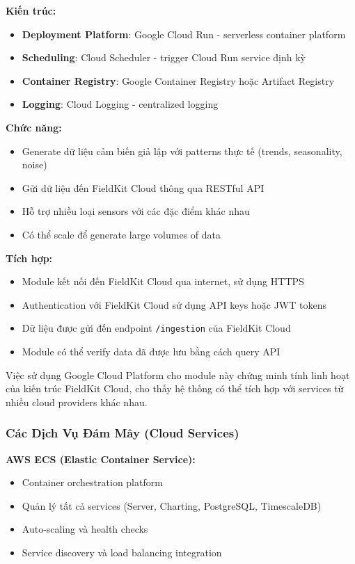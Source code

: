 \textbf{Kiến trúc:}
\begin{itemize}
    \item \textbf{Deployment Platform}: Google Cloud Run - serverless container platform
    \item \textbf{Scheduling}: Cloud Scheduler - trigger Cloud Run service định kỳ
    \item \textbf{Container Registry}: Google Container Registry hoặc Artifact Registry
    \item \textbf{Logging}: Cloud Logging - centralized logging
\end{itemize}

\textbf{Chức năng:}
\begin{itemize}
    \item Generate dữ liệu cảm biến giả lập với patterns thực tế (trends, seasonality, noise)
    \item Gửi dữ liệu đến FieldKit Cloud thông qua RESTful API
    \item Hỗ trợ nhiều loại sensors với các đặc điểm khác nhau
    \item Có thể scale để generate large volumes of data
\end{itemize}

\textbf{Tích hợp:}
\begin{itemize}
    \item Module kết nối đến FieldKit Cloud qua internet, sử dụng HTTPS
    \item Authentication với FieldKit Cloud sử dụng API keys hoặc JWT tokens
    \item Dữ liệu được gửi đến endpoint \texttt{/ingestion} của FieldKit Cloud
    \item Module có thể verify data đã được lưu bằng cách query API
\end{itemize}

Việc sử dụng Google Cloud Platform cho module này chứng minh tính linh hoạt của kiến trúc FieldKit Cloud, cho thấy hệ thống có thể tích hợp với services từ nhiều cloud providers khác nhau.

\subsubsection{Các Dịch Vụ Đám Mây (Cloud Services)}

\textbf{AWS ECS (Elastic Container Service):}
\begin{itemize}
    \item Container orchestration platform
    \item Quản lý tất cả services (Server, Charting, PostgreSQL, TimescaleDB)
    \item Auto-scaling và health checks
    \item Service discovery và load balancing integration
\end{itemize}

